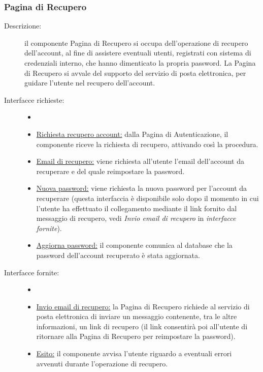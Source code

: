 \documentclass[11pt, a4paper]{article}
\theoremstyle{definition} %
\begin{document}
\subsubsection{Pagina di Recupero}
\begin{description}
    \item[Descrizione:] il componente Pagina di Recupero si occupa dell'operazione
    di recupero dell'account, al fine di assistere eventuali utenti, registrati
    con sistema di credenziali interno, che hanno dimenticato la propria
    password. La Pagina di Recupero si avvale del supporto del servizio di
    posta elettronica, per guidare l'utente nel recupero dell'account.

    \item[Interfacce richieste:]
    \begin{itemize}
        \item[]

        \item \underline{Richiesta recupero account:} dalla Pagina di Autenticazione,
        il componente riceve la richiesta di recupero, attivando così la procedura.

        \item \underline{Email di recupero:} viene richiesta all'utente l'email
        dell'account da recuperare e del quale reimpostare la password.

        \item \underline{Nuova password:} viene richiesta la nuova password per
        l'account da recuperare (questa interfaccia è disponibile solo dopo il momento
        in cui l'utente ha effettuato il collegamento mediante il link fornito dal messaggio di
        recupero, vedi \textit{Invio email di recupero} in \textit{interfacce fornite}).

        \item \underline{Aggiorna password:} il componente comunica al database
        che la password dell'account recuperato è stata aggiornata.
    \end{itemize}

    \item[Interfacce fornite:]
    \begin{itemize}
        \item[]

        \item \underline{Invio email di recupero:} la Pagina di Recupero
        richiede al servizio di posta elettronica di inviare un messaggio
        contenente, tra le altre informazioni, un link di recupero (il link
        consentirà poi all'utente di ritornare alla Pagina di Recupero per
        reimpostare la password).

        \item \underline{Esito:} il componente avvisa l'utente riguardo
        a eventuali errori avvenuti durante l'operazione di recupero.
    \end{itemize}
\end{description}
\end{document}

